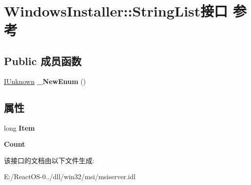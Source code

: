\hypertarget{interface_windows_installer_1_1_string_list}{}\section{Windows\+Installer\+:\+:String\+List接口 参考}
\label{interface_windows_installer_1_1_string_list}
\subsection*{Public 成员函数}
\begin{DoxyCompactItemize}
\item 
\mbox{\label{interface_windows_installer_1_1_string_list_a9fe0e5da3c18f2dd44008a9c07d350c1}} 
\hyperlink{interface_i_unknown}{I\+Unknown} {\bfseries \+\_\+\+New\+Enum} ()
\end{DoxyCompactItemize}
\subsection*{属性}
\begin{DoxyCompactItemize}
\item 
\mbox{\label{interface_windows_installer_1_1_string_list_a19141f9f6ba519d33b148c1ce1dfc631}} 
long {\bfseries Item}
\item 
\mbox{\label{interface_windows_installer_1_1_string_list_a9827c0bbf3a0bc4c51a961bcc06624c3}} 
{\bfseries Count}
\end{DoxyCompactItemize}


该接口的文档由以下文件生成\+:\begin{DoxyCompactItemize}
\item 
E\+:/\+React\+O\+S-\/0../dll/win32/msi/msiserver.\+idl\end{DoxyCompactItemize}
